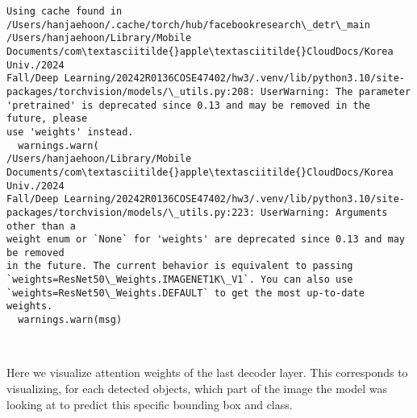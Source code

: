 \documentclass[11pt]{article}
\begin{document}
    \begin{Verbatim}[commandchars=\\\{\}]
Using cache found in
/Users/hanjaehoon/.cache/torch/hub/facebookresearch\_detr\_main
/Users/hanjaehoon/Library/Mobile Documents/com\textasciitilde{}apple\textasciitilde{}CloudDocs/Korea Univ./2024
Fall/Deep Learning/20242R0136COSE47402/hw3/.venv/lib/python3.10/site-
packages/torchvision/models/\_utils.py:208: UserWarning: The parameter
'pretrained' is deprecated since 0.13 and may be removed in the future, please
use 'weights' instead.
  warnings.warn(
/Users/hanjaehoon/Library/Mobile Documents/com\textasciitilde{}apple\textasciitilde{}CloudDocs/Korea Univ./2024
Fall/Deep Learning/20242R0136COSE47402/hw3/.venv/lib/python3.10/site-
packages/torchvision/models/\_utils.py:223: UserWarning: Arguments other than a
weight enum or `None` for 'weights' are deprecated since 0.13 and may be removed
in the future. The current behavior is equivalent to passing
`weights=ResNet50\_Weights.IMAGENET1K\_V1`. You can also use
`weights=ResNet50\_Weights.DEFAULT` to get the most up-to-date weights.
  warnings.warn(msg)
    \end{Verbatim}

    \begin{center}
    \end{center}
    { \hspace*{\fill} \\}
    
    Here we visualize attention weights of the last decoder layer. This
corresponds to visualizing, for each detected objects, which part of the
image the model was looking at to predict this specific bounding box and
class.
\end{document}
